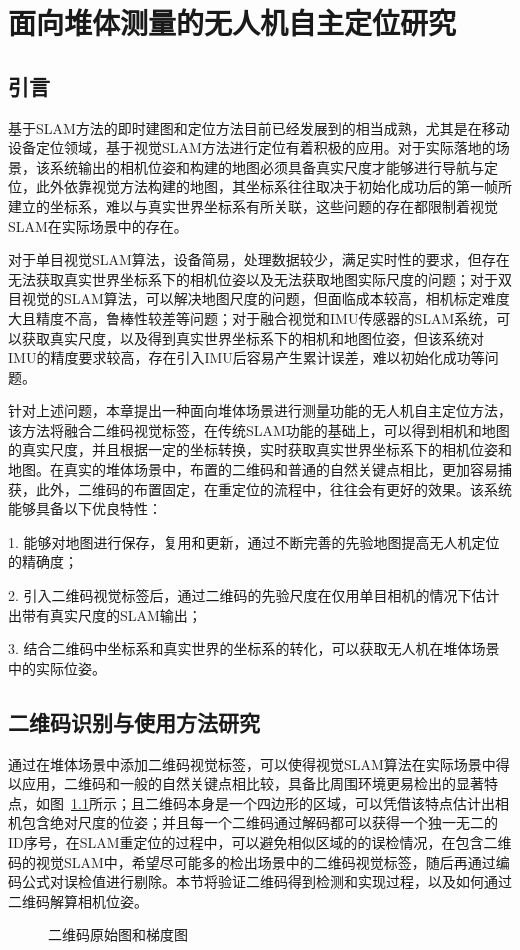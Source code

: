 \chapter{面向堆体测量的无人机自主定位研究}
\label{cha:chap2}
\section{引言}
\label{sec:2.1}
基于SLAM方法的即时建图和定位方法目前已经发展到的相当成熟，尤其是在移动设备定位领域，基于视觉SLAM方法进行定位有着积极的应用。对于实际落地的场景，该系统输出的相机位姿和构建的地图必须具备真实尺度才能够进行导航与定位，此外依靠视觉方法构建的地图，其坐标系往往取决于初始化成功后的第一帧所建立的坐标系，难以与真实世界坐标系有所关联，这些问题的存在都限制着视觉SLAM在实际场景中的存在。

对于单目视觉SLAM算法，设备简易，处理数据较少，满足实时性的要求，但存在无法获取真实世界坐标系下的相机位姿以及无法获取地图实际尺度的问题；对于双目视觉的SLAM算法，可以解决地图尺度的问题，但面临成本较高，相机标定难度大且精度不高，鲁棒性较差等问题；对于融合视觉和IMU传感器的SLAM系统，可以获取真实尺度，以及得到真实世界坐标系下的相机和地图位姿，但该系统对IMU的精度要求较高，存在引入IMU后容易产生累计误差，难以初始化成功等问题。

针对上述问题，本章提出一种面向堆体场景进行测量功能的无人机自主定位方法，该方法将融合二维码视觉标签，在传统SLAM功能的基础上，可以得到相机和地图的真实尺度，并且根据一定的坐标转换，实时获取真实世界坐标系下的相机位姿和地图。在真实的堆体场景中，布置的二维码和普通的自然关键点相比，更加容易捕获，此外，二维码的布置固定，在重定位的流程中，往往会有更好的效果。该系统能够具备以下优良特性：

1. 能够对地图进行保存，复用和更新，通过不断完善的先验地图提高无人机定位的精确度；

2. 引入二维码视觉标签后，通过二维码的先验尺度在仅用单目相机的情况下估计出带有真实尺度的SLAM输出；

3. 结合二维码中坐标系和真实世界的坐标系的转化，可以获取无人机在堆体场景中的实际位姿。
\section{二维码识别与使用方法研究}
\label{sec:2.2}
通过在堆体场景中添加二维码视觉标签，可以使得视觉SLAM算法在实际场景中得以应用，二维码和一般的自然关键点相比较，具备比周围环境更易检出的显著特点，如图~\ref{fig:2VSLAM_MarkerandGradient}所示；且二维码本身是一个四边形的区域，可以凭借该特点估计出相机包含绝对尺度的位姿；并且每一个二维码通过解码都可以获得一个独一无二的ID序号，在SLAM重定位的过程中，可以避免相似区域的的误检情况，在包含二维码的视觉SLAM中，希望尽可能多的检出场景中的二维码视觉标签，随后再通过编码公式对误检值进行剔除。本节将验证二维码得到检测和实现过程，以及如何通过二维码解算相机位姿。
\begin{figure}[H]
  \centering%
  \hspace{3em}%
  \caption{二维码原始图和梯度图}
  \label{fig:2VSLAM_MarkerandGradient}
\end{figure}
